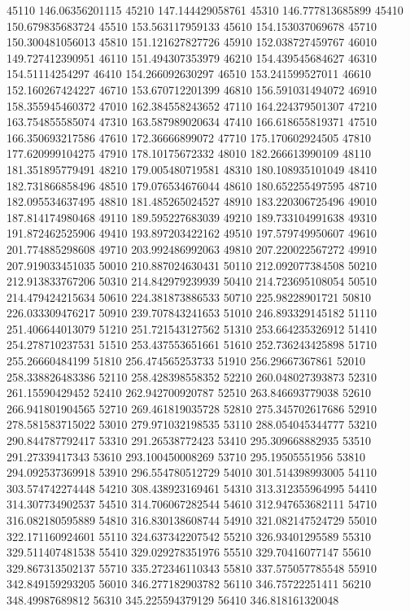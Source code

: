 {45110 146.06356201115
45210 147.144429058761
45310 146.777813685899
45410 150.679835683724
45510 153.563117959133
45610 154.153037069678
45710 150.300481056013
45810 151.121627827726
45910 152.038727459767
46010 149.727412390951
46110 151.494307353979
46210 154.439545684627
46310 154.51114254297
46410 154.266092630297
46510 153.241599527011
46610 152.160267424227
46710 153.670712201399
46810 156.591031494072
46910 158.355945460372
47010 162.384558243652
47110 164.224379501307
47210 163.754855585074
47310 163.587989020634
47410 166.618655819371
47510 166.350693217586
47610 172.36666899072
47710 175.170602924505
47810 177.620999104275
47910 178.10175672332
48010 182.266613990109
48110 181.351895779491
48210 179.005480719581
48310 180.108935101049
48410 182.731866858496
48510 179.076534676044
48610 180.652255497595
48710 182.095534637495
48810 181.485265024527
48910 183.220306725496
49010 187.814174980468
49110 189.595227683039
49210 189.733104991638
49310 191.872462525906
49410 193.897203422162
49510 197.579749950607
49610 201.774885298608
49710 203.992486992063
49810 207.220022567272
49910 207.919033451035
50010 210.887024630431
50110 212.092077384508
50210 212.913833767206
50310 214.842979239939
50410 214.723695108054
50510 214.479424215634
50610 224.381873886533
50710 225.98228901721
50810 226.033309476217
50910 239.707843241653
51010 246.893329145182
51110 251.406644013079
51210 251.721543127562
51310 253.664235326912
51410 254.278710237531
51510 253.437553651661
51610 252.736243425898
51710 255.26660484199
51810 256.474565253733
51910 256.29667367861
52010 258.338826483386
52110 258.428398558352
52210 260.048027393873
52310 261.15590429452
52410 262.942700920787
52510 263.846693779038
52610 266.941801904565
52710 269.461819035728
52810 275.345702617686
52910 278.581583715022
53010 279.971032198535
53110 288.054045344777
53210 290.844787792417
53310 291.26538772423
53410 295.309668882935
53510 291.27339417343
53610 293.100450008269
53710 295.19505551956
53810 294.092537369918
53910 296.554780512729
54010 301.514398993005
54110 303.574742274448
54210 308.438923169461
54310 313.312355964995
54410 314.307734902537
54510 314.706067282544
54610 312.947653682111
54710 316.082180595889
54810 316.830138608744
54910 321.082147524729
55010 322.171160924601
55110 324.637342207542
55210 326.93401295589
55310 329.511407481538
55410 329.029278351976
55510 329.70416077147
55610 329.867313502137
55710 335.272346110343
55810 337.575057785548
55910 342.849159293205
56010 346.277182903782
56110 346.75722251411
56210 348.49987689812
56310 345.225594379129
56410 346.818161320048
}
